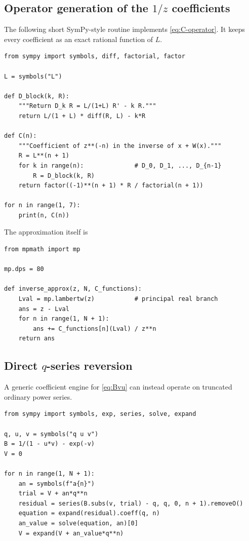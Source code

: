 \documentclass[11pt,a4paper]{article}
\numberwithin{equation}{section}
\theoremstyle{definition}
\theoremstyle{remark}
\begin{document}
\subsection[Operator generation of the 1/z coefficients]{Operator generation of the \(1/z\) coefficients}

The following short SymPy-style routine implements
\eqref{eq:C-operator}.  It keeps every coefficient as an exact rational
function of \(L\).

\begin{lstlisting}[style=pythonstyle,caption={Exact generation of the coefficient \(C_n(L)\).},label={lst:C-generator}]
from sympy import symbols, diff, factorial, factor

L = symbols("L")

def D_block(k, R):
    """Return D_k R = L/(1+L) R' - k R."""
    return L/(1 + L) * diff(R, L) - k*R

def C(n):
    """Coefficient of z**(-n) in the inverse of x + W(x)."""
    R = L**(n + 1)
    for k in range(n):              # D_0, D_1, ..., D_{n-1}
        R = D_block(k, R)
    return factor((-1)**(n + 1) * R / factorial(n + 1))

for n in range(1, 7):
    print(n, C(n))
\end{lstlisting}

The approximation itself is
\begin{lstlisting}[style=pythonstyle,caption={Evaluation of a sector truncation.}]
from mpmath import mp

mp.dps = 80

def inverse_approx(z, N, C_functions):
    Lval = mp.lambertw(z)           # principal real branch
    ans = z - Lval
    for n in range(1, N + 1):
        ans += C_functions[n](Lval) / z**n
    return ans
\end{lstlisting}

\subsection[Direct q-series reversion]{Direct \(q\)-series reversion}

A generic coefficient engine for \eqref{eq:Bvu} can instead operate on
truncated ordinary power series.

\begin{lstlisting}[style=pythonstyle,caption={Triangular reversion of \(q=B(v,u)\).}]
from sympy import symbols, exp, series, solve, expand

q, u, v = symbols("q u v")
B = 1/(1 - u*v) - exp(-v)
V = 0

for n in range(1, N + 1):
    an = symbols(f"a{n}")
    trial = V + an*q**n
    residual = series(B.subs(v, trial) - q, q, 0, n + 1).removeO()
    equation = expand(residual).coeff(q, n)
    an_value = solve(equation, an)[0]
    V = expand(V + an_value*q**n)
\end{lstlisting}
\end{document}
